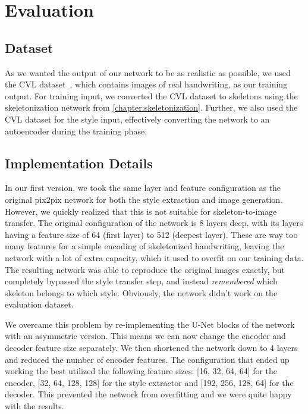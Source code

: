 \section{Evaluation}
\subsection{Dataset}
As we wanted the output of our network to be as realistic as possible, we used the CVL dataset~\cite{cvl}, which contains images of real handwriting, as our training output. For training input, we converted the CVL dataset to skeletons using the skeletonization network from \cref{chapter:skeletonization}. Further, we also used the CVL dataset for the style input, effectively converting the network to an autoencoder during the training phase.

\subsection{Implementation Details}
In our first version, we took the same layer and feature configuration as the original pix2pix network for both the style extraction and image generation. However, we quickly realized that this is not suitable for skeleton-to-image transfer. The original configuration of the network is 8 layers deep,
with its layers having a feature size of 64 (first layer) to 512 (deepest layer).
These are way too many features for a simple encoding of skeletonized handwriting, leaving the network with a lot of extra capacity, which it used to overfit on our training data. The resulting network was able to reproduce the original images exactly, but completely bypassed the style transfer step, and instead \emph{remembered} which skeleton belongs to which style. Obviously, the network didn't work on the evaluation dataset.

We overcame this problem by re-implementing the U-Net blocks of the network with an asymmetric version. This means we can now change the encoder and decoder feature size separately. We then shortened the network down to 4 layers and reduced the number of encoder features. The configuration that ended up working the best utilized the following feature sizes: [16, 32, 64, 64] for the encoder, [32, 64, 128, 128] for the style extractor and [192, 256, 128, 64] for the decoder. This prevented the network from overfitting and we were quite happy with the results.

